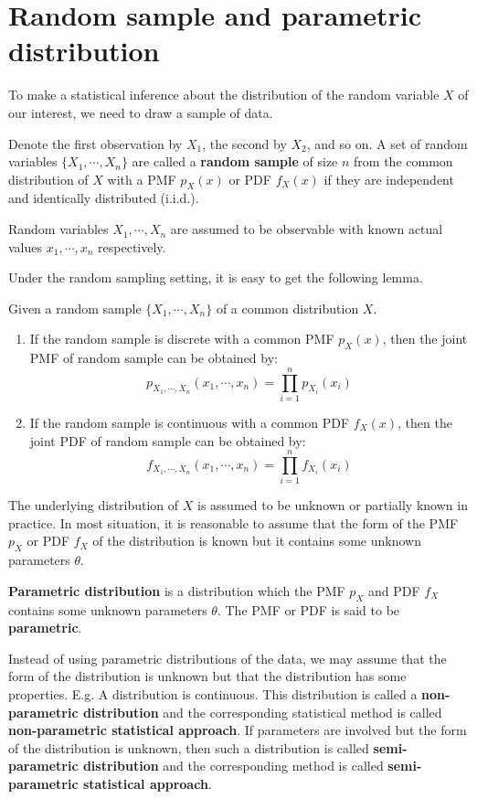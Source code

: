 \documentclass{huhtakm-template-book-v2}
\begin{document}
\section{Random sample and parametric distribution}
To make a statistical inference about the distribution of the random variable $X$ of our interest, we need to draw a sample of data.
\begin{defn}
	Denote the first observation by $X_{1}$, the second by $X_{2}$, and so on. A set of random variables $\{X_{1},\cdots,X_{n}\}$ are called a \textbf{random sample} of size $n$ from the common distribution of $X$ with a PMF $p_{X}(x)$ or PDF $f_{X}(x)$ if they are independent and identically distributed (i.i.d.).
\end{defn}
\begin{rem}
	Random variables $X_{1},\cdots,X_{n}$ are assumed to be observable with known actual values $x_{1},\cdots,x_{n}$ respectively.
\end{rem}
Under the random sampling setting, it is easy to get the following lemma.
\begin{lem}
	Given a random sample $\{X_{1},\cdots,X_{n}\}$ of a common distribution $X$.
	\begin{enumerate}
		\item If the random sample is discrete with a common PMF $p_{X}(x)$, then the joint PMF of random sample can be obtained by:
		\begin{equation*}
			p_{X_{1},\cdots,X_{n}}(x_{1},\cdots,x_{n})=\prod_{i=1}^{n}p_{X_{i}}(x_{i})
		\end{equation*}
		\item If the random sample is continuous with a common PDF $f_{X}(x)$, then the joint PDF of random sample can be obtained by:
		\begin{equation*}
			f_{X_{1},\cdots,X_{n}}(x_{1},\cdots,x_{n})=\prod_{i=1}^{n}f_{X_{i}}(x_{i})
		\end{equation*}
	\end{enumerate}
\end{lem}
The underlying distribution of $X$ is assumed to be unknown or partially known in practice. In most situation, it is reasonable to assume that the form of the PMF $p_{X}$ or PDF $f_{X}$ of the distribution is known but it contains some unknown parameters $\theta$.
\begin{defn}
	\textbf{Parametric distribution} is a distribution which the PMF $p_{X}$ and PDF $f_{X}$ contains some unknown parameters $\theta$. The PMF or PDF is said to be \textbf{parametric}.
\end{defn}
\begin{rem}
	Instead of using parametric distributions of the data, we may assume that the form of the distribution is unknown but that the distribution has some properties. E.g. A distribution is continuous. This distribution is called a \textbf{non-parametric distribution} and the corresponding statistical method is called \textbf{non-parametric statistical approach}. If parameters are involved but the form of the distribution is unknown, then such a distribution is called \textbf{semi-parametric distribution} and the corresponding method is called \textbf{semi-parametric statistical approach}.
\end{rem}
\end{document}

